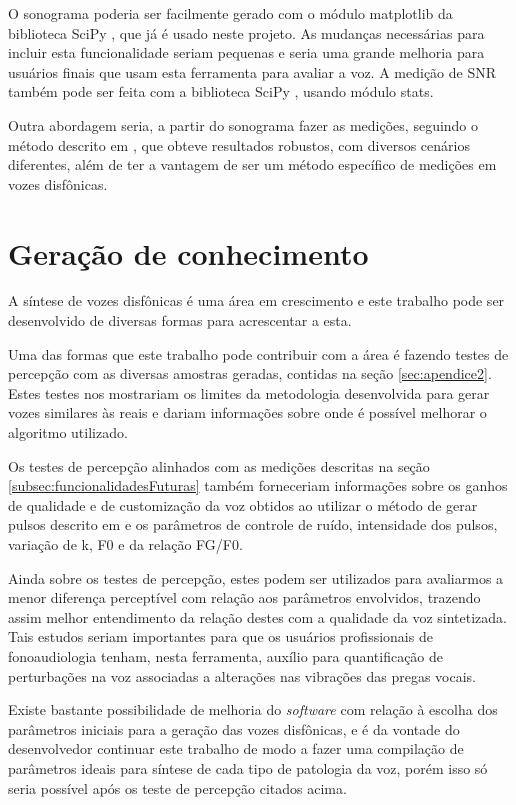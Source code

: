 \documentclass[
  12pt,       
  openright,      
  twoside,      
  a4paper,      
  english,      
  french,       
  spanish,      
  brazil,     
  ]{abntex2}
\begin{document}
O sonograma poderia ser facilmente gerado com o módulo matplotlib da biblioteca SciPy \cite{scipy}, que já é usado neste projeto. As mudanças necessárias para incluir esta funcionalidade seriam pequenas e seria uma grande melhoria para usuários finais que usam esta ferramenta para avaliar a voz. A medição de SNR também pode ser feita com a biblioteca SciPy \cite{scipy}, usando módulo stats.

Outra abordagem seria, a partir do sonograma fazer as medições, seguindo o método descrito em , que obteve resultados robustos, com diversos cenários diferentes, além de ter a vantagem de ser um método específico de medições em vozes disfônicas.

\section{Geração de conhecimento}
\label{subsec:geracaoConhecimento}
A síntese de vozes disfônicas é uma área em crescimento e este trabalho pode ser desenvolvido de diversas formas para acrescentar a esta.

Uma das formas que este trabalho pode contribuir com a área é fazendo testes de percepção com as diversas amostras geradas, contidas na seção \ref{sec:apendice2}. Estes testes nos mostrariam os limites da metodologia desenvolvida para gerar vozes similares às reais e dariam informações sobre onde é possível melhorar o algoritmo utilizado.

Os testes de percepção alinhados com as medições descritas na seção \ref{subsec:funcionalidadesFuturas} também forneceriam informações sobre os ganhos de qualidade e de customização da voz obtidos ao utilizar o método de gerar pulsos descrito em  e os parâmetros de controle de ruído, intensidade dos pulsos, variação de k, F0 e da relação FG/F0.

Ainda sobre os testes de percepção, estes podem ser utilizados para avaliarmos a menor diferença perceptível com relação aos parâmetros envolvidos, trazendo assim melhor entendimento da relação destes com a qualidade da voz sintetizada. Tais estudos seriam importantes para que os usuários profissionais de fonoaudiologia tenham, nesta ferramenta, auxílio para quantificação de perturbações na voz associadas a alterações nas vibrações das pregas vocais.

Existe bastante possibilidade de melhoria do \textit{software} com relação à escolha dos parâmetros iniciais para a geração das vozes disfônicas, e é da vontade do desenvolvedor continuar este trabalho de modo a fazer uma compilação de parâmetros ideais para síntese de cada tipo de patologia da voz, porém isso só seria possível após os teste de percepção citados acima.
\end{document}
